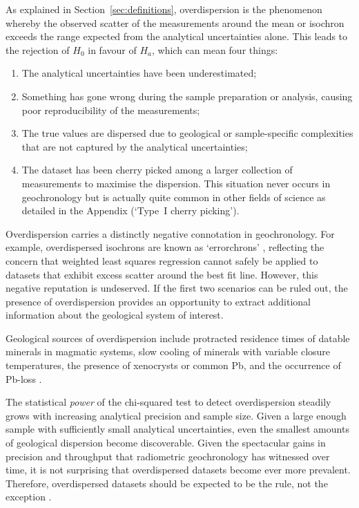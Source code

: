 \documentclass{article}
\begin{document}
As explained in Section~\ref{sec:definitions}, overdispersion is the
phenomenon whereby the observed scatter of the measurements around the
mean or isochron exceeds the range expected from the analytical
uncertainties alone. This leads to the rejection of $H_0$ in favour of
$H_a$, which can mean four things:

\begin{enumerate}
\item The analytical uncertainties have been underestimated;
\item Something has gone wrong during the sample preparation or
  analysis, causing poor reproducibility of the measurements;
\item The true values are dispersed due to geological or
  sample-specific complexities that are not captured by the analytical
  uncertainties;
\item The dataset has been cherry picked among a larger collection of
  measurements to maximise the dispersion. This situation never occurs
  in geochronology but is actually quite common in other fields of
  science as detailed in the Appendix (`Type~I cherry picking').
\end{enumerate}

Overdispersion carries a distinctly negative connotation in
geochronology. For example, overdispersed isochrons are known as
`errorchrons' \citep{brooks1972}, reflecting the concern that weighted
least squares regression cannot safely be applied to datasets that
exhibit excess scatter around the best fit line. However, this
negative reputation is undeserved. If the first two scenarios can be
ruled out, the presence of overdispersion provides an opportunity to
extract additional information about the geological system of
interest.\medskip

Geological sources of overdispersion include protracted residence
times of datable minerals in magmatic systems, slow cooling of
minerals with variable closure temperatures, the presence of
xenocrysts or common Pb, and the occurrence of Pb-loss
\citep{galbraith1993,rioux2012,keller2018,klein2024}.\medskip

The statistical \emph{power} of the chi-squared test to detect
overdispersion steadily grows with increasing analytical precision and
sample size. Given a large enough sample with sufficiently small
analytical uncertainties, even the smallest amounts of geological
dispersion become discoverable.  Given the spectacular gains in
precision and throughput that radiometric geochronology has witnessed
over time, it is not surprising that overdispersed datasets become
ever more prevalent. Therefore, overdispersed datasets should be
expected to be the rule, not the exception \citep{vermeesch2025c}.
\end{document}
